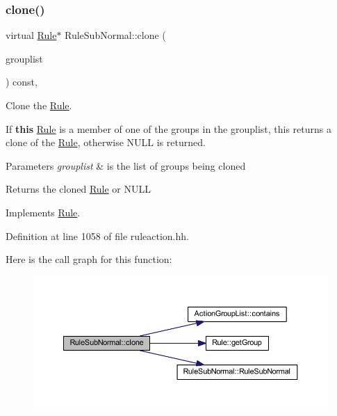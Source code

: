 \subsubsection{\texorpdfstring{clone()}{clone()}}
{\footnotesize\ttfamily virtual \mbox{\hyperlink{class_rule}{Rule}}$\ast$ Rule\+Sub\+Normal\+::clone (\begin{DoxyParamCaption}\item[{const \mbox{\hyperlink{class_action_group_list}{Action\+Group\+List}} \&}]{grouplist }\end{DoxyParamCaption}) const\hspace{0.3cm}{\ttfamily [inline]}, {\ttfamily [virtual]}}



Clone the \mbox{\hyperlink{class_rule}{Rule}}. 

If {\bfseries{this}} \mbox{\hyperlink{class_rule}{Rule}} is a member of one of the groups in the grouplist, this returns a clone of the \mbox{\hyperlink{class_rule}{Rule}}, otherwise N\+U\+LL is returned. 
\begin{DoxyParams}{Parameters}
{\em grouplist} & is the list of groups being cloned \\
\hline
\end{DoxyParams}
\begin{DoxyReturn}{Returns}
the cloned \mbox{\hyperlink{class_rule}{Rule}} or N\+U\+LL 
\end{DoxyReturn}


Implements \mbox{\hyperlink{class_rule_a70de90a76461bfa7ea0b575ce3c11e4d}{Rule}}.



Definition at line 1058 of file ruleaction.\+hh.

Here is the call graph for this function\+:
\nopagebreak
\begin{figure}[H]
\begin{center}
\leavevmode
\includegraphics[width=350pt]{class_rule_sub_normal_a04e245995224e1a60ab407ba3ad4696a_cgraph}
\end{center}
\end{figure}
\mbox{\label{class_rule_sub_normal_a18d6ecf9c6fd365f4f43f906782f101b}} 

